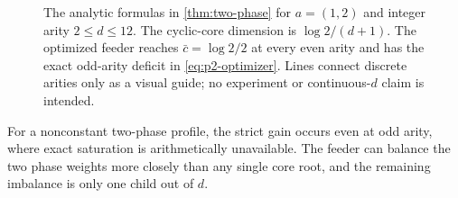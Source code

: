 \begin{figure}[t]
  \centering
  
  \caption{The analytic formulas in \cref{thm:two-phase} for
  $a=(1,2)$ and integer arity $2\leq d\leq12$.  The cyclic-core dimension is
  $\log2/(d+1)$.  The optimized feeder reaches $\bar c=\log2/2$ at every even
  arity and has the exact odd-arity deficit in
  \eqref{eq:p2-optimizer}.  Lines connect discrete arities only as a visual
  guide; no experiment or continuous-$d$ claim is intended.}
  \label{fig:two-phase}
\end{figure}

For a nonconstant two-phase profile, the strict gain occurs even at odd
arity, where exact saturation is arithmetically unavailable.  The feeder can
balance the two phase weights more closely than any single core root, and the
remaining imbalance is only one child out of $d$.
